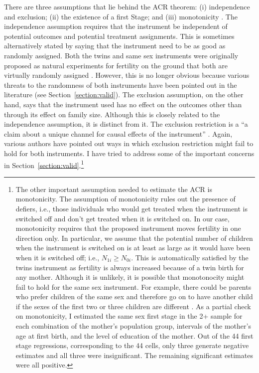 There are three assumptions that lie behind the ACR theorem: (i) independence and exclusion; (ii) the existence of a first Stage; and (iii) monotonicity \parencite{Angrist2009}. The independence assumption requires that the instrument be independent of potential outcomes and potential treatment assignments. This is sometimes alternatively stated by saying that the instrument need to be as good as randomly assigned. Both the twins and same sex instruments were originally proposed as natural experiments for fertility on the ground that both are virtually randomly assigned \parencite{rosenzweig_testing_1980,angrist_children_1998}. However, this is no longer obvious because various threats to the randomness of both instruments have been pointed out in the literature (see Section~\ref{section:valid}). The exclusion assumption, on the other hand, says that the instrument used has no effect on the outcomes other than through its effect on family size.  Although this is closely related to the independence assumption, it is distinct from it. The exclusion restriction is a \enquote{a claim about a unique channel for causal effects of the instrument} \parencite[p.~153]{Angrist2009}. Again, various authors have pointed out ways in which exclusion restriction might fail to hold for both instruments. I have tried to address some of the important concerns in Section~\ref{section:valid}.\footnote{ The other important assumption needed to estimate the ACR is monotonicity. The assumption of monotonicity rules out the presence of defiers, i.e., those individuals who would get treated when the instrument is switched off and don't get treated when it is switched on. In our case, monotonicity requires that the proposed instrument moves fertility in one direction only. In particular, we assume that the potential number of children when the instrument is switched on is at least as large as it would have been when it is switched off; i.e., $ N_{1i} \geq N_{0i} $. This is automatically satisfied by the twins instrument as fertility is always increased because of a twin birth for any mother. Although it is unlikely, it is possible that monotonocity might fail to hold for the same sex instrument. For example, there could be parents who prefer children of the same sex and therefore go on to have another child if the sexes of the first two or three children are different \parencite{Huber2015}. As a partial check on monotonicity, I estimated the same sex first stage in the 2+ sample for each combination of the mother's population group, intervals of the mother's age at first birth, and the level of education of the mother. Out of the 44 first stage regressions, corresponding to the 44 cells, only three generate negative estimates and all three were insignificant. The remaining significant estimates were all positive.} 

